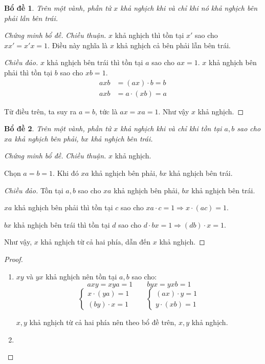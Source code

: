 \documentclass[class=linearalgebra,crop=false]{standalone}
\newtheorem{lemma}{Bổ đề}
\begin{document}
\begin{lemma}Trên một vành, phần tử $x$ khả nghịch khi và chỉ khi nó khả nghịch bên phải lẫn bên trái.
\end{lemma}

\begin{proof}[Chứng minh bổ đề]\textit{Chiều thuận.} $x$ khả nghịch thì tồn tại $x'$ sao cho $xx' = x'x = 1$. Điều này nghĩa là $x$ khả nghịch cả bên phải lẫn bên trái.
    \par\textit{Chiều đảo.} $x$ khả nghịch bên trái thì tồn tại $a$ sao cho $ax = 1$. $x$ khả nghịch bên phải thì tồn tại $b$ sao cho $xb = 1$.
    \begin{align*}
        axb &= (ax)\cdot b = b \\
        axb &= a\cdot (xb) = a
    \end{align*}
    \par Từ điều trên, ta suy ra $a = b$, tức là $ax = xa = 1$. Như vậy $x$ khả nghịch.
\end{proof}

\begin{lemma}Trên một vành, phần tử $x$ khả nghịch khi và chỉ khi tồn tại $a, b$ sao cho $xa$ khả nghịch bên phải, $bx$ khả nghịch bên trái.
\end{lemma}

\begin{proof}[Chứng minh bổ đề]\textit{Chiều thuận.} $x$ khả nghịch.
    \par Chọn $a = b = 1$. Khi đó $xa$ khả nghịch bên phải, $bx$ khả nghịch bên trái.
    \par \textit{Chiều đảo.} Tồn tại $a, b$ sao cho $xa$ khả nghịch bên phải, $bx$ khả nghịch bên trái.
    \par $xa$ khả nghịch bên phải thì tồn tại $c$ sao cho $xa\cdot c = 1\Rightarrow x \cdot (ac) = 1$.
    \par $bx$ khả nghịch bên trái thì tồn tại $d$ sao cho $d\cdot bx = 1\Rightarrow (db)\cdot x = 1$.
    \par Như vậy, $x$ khả nghịch từ cả hai phía, dẫn đến $x$ khả nghịch.
\end{proof}

\begin{proof}
    \begin{enumerate}[label = (\alph*)]
        \item $xy$ và $yx$ khả nghịch nên tồn tại $a, b$ sao cho:
        \[ axy = xya = 1\qquad byx = yxb = 1 \]
        \[
            \begin{cases}
                x\cdot (ya) = 1 \\
                (by)\cdot x = 1
            \end{cases}
            \qquad
            \begin{cases}
                (ax)\cdot y = 1 \\
                y\cdot (xb) = 1
            \end{cases}
        \]
        \par $x, y$ khả nghịch từ cả hai phía nên theo bổ đề trên, $x, y$ khả nghịch.
        \item
    \end{enumerate}
\end{proof}
\end{document}
